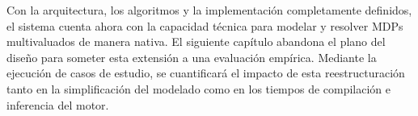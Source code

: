 \vspace{0.5cm}
Con la arquitectura, los algoritmos y la implementación completamente definidos, el sistema cuenta ahora con la capacidad técnica para modelar y resolver MDPs multivaluados de manera nativa. El siguiente capítulo abandona el plano del diseño para someter esta extensión a una evaluación empírica. Mediante la ejecución de casos de estudio, se cuantificará el impacto de esta reestructuración tanto en la simplificación del modelado como en los tiempos de compilación e inferencia del motor.